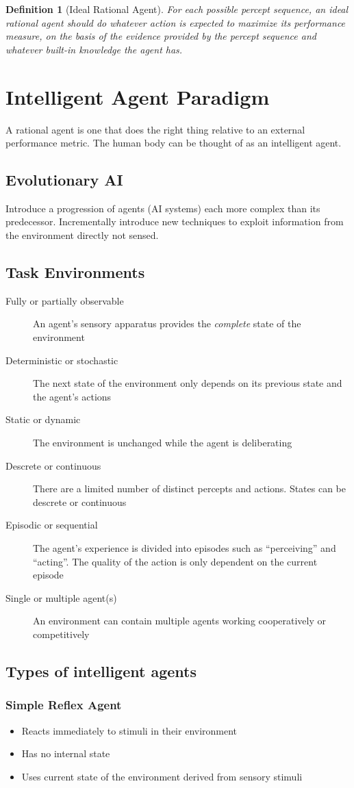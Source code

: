 \documentclass[a4paper]{article}
\newtheorem{definition}{Definition}[section]
\begin{document}
\begin{definition}[Ideal Rational Agent]
  For each possible percept sequence, an ideal rational agent should do whatever
  action is expected to maximize its performance measure, on the basis of the
  evidence provided by the percept sequence and whatever built-in knowledge the
  agent has.
\end{definition}

\section{Intelligent Agent Paradigm}

A rational agent is one that does the right thing relative to an external
performance metric. The human body can be thought of as an intelligent agent.

\subsection{Evolutionary AI}

Introduce a progression of agents (AI systems) each more complex than its
predecessor. Incrementally introduce new techniques to exploit information from
the environment directly not sensed.

\subsection{Task Environments}
\begin{description}
  \item[Fully or partially observable] An agent's sensory apparatus provides the
    \textit{complete} state of the environment
  \item[Deterministic or stochastic] The next state of the environment only
    depends on its previous state and the agent's actions
  \item[Static or dynamic] The environment is unchanged while the agent is
    deliberating
  \item[Descrete or continuous] There are a limited number of distinct percepts
    and actions. States can be descrete or continuous
  \item[Episodic or sequential] The agent's experience is divided into episodes
    such as ``perceiving'' and ``acting''. The quality of the action is only
    dependent on the current episode
  \item[Single or multiple agent(s)] An environment can contain multiple agents
    working cooperatively or competitively
\end{description}

\subsection{Types of intelligent agents}

\subsubsection{Simple Reflex Agent}
\begin{itemize}
  \item Reacts immediately to stimuli in their environment
  \item Has no internal state
  \item Uses current state of the environment derived from sensory stimuli
\end{itemize}
\end{document}
